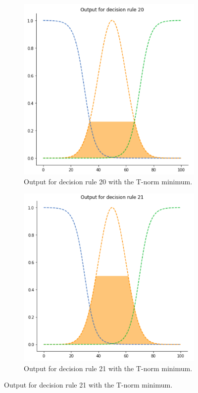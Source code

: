 \begin{figure}[ht]
\begin{subfigure}{.5\textwidth}
  \centering
  \includegraphics[width=.8\linewidth]{figures/third/min1.png}  
  \caption{Output for decision rule 20 with the T-norm minimum.}
  \label{fig:3min1}
\end{subfigure}
\begin{subfigure}{.5\textwidth}
  \centering
  \includegraphics[width=.8\linewidth]{figures/third/min2.png}  
  \caption{Output for decision rule 21 with the T-norm minimum.}
  \label{fig:3min2}
\end{subfigure}

\end{figure}
